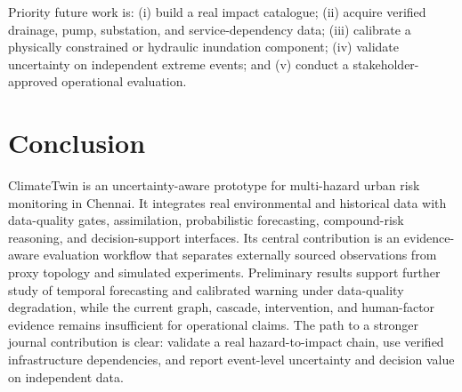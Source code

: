 \documentclass[journal]{IEEEtran}
\begin{document}
Priority future work is: (i) build a real impact catalogue; (ii) acquire verified drainage, pump, substation, and service-dependency data; (iii) calibrate a physically constrained or hydraulic inundation component; (iv) validate uncertainty on independent extreme events; and (v) conduct a stakeholder-approved operational evaluation.

\section{Conclusion}
ClimateTwin is an uncertainty-aware prototype for multi-hazard urban risk monitoring in Chennai. It integrates real environmental and historical data with data-quality gates, assimilation, probabilistic forecasting, compound-risk reasoning, and decision-support interfaces. Its central contribution is an evidence-aware evaluation workflow that separates externally sourced observations from proxy topology and simulated experiments. Preliminary results support further study of temporal forecasting and calibrated warning under data-quality degradation, while the current graph, cascade, intervention, and human-factor evidence remains insufficient for operational claims. The path to a stronger journal contribution is clear: validate a real hazard-to-impact chain, use verified infrastructure dependencies, and report event-level uncertainty and decision value on independent data.
\end{document}
